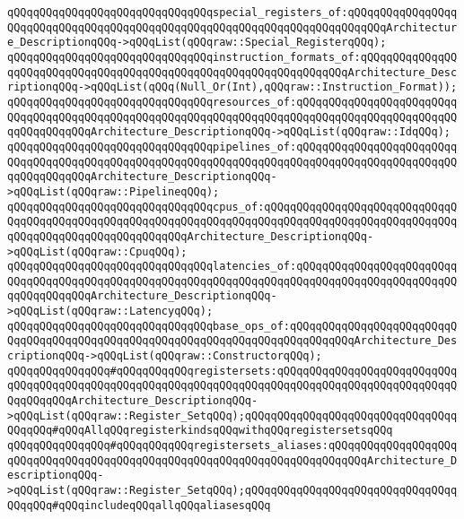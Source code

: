 \verb|qQQqqQQqqQQqqQQqqQQqqQQqqQQqqQQqspecial_registers_of:qQQqqQQqqQQqqQQqqQQqqQQqqQQqqQQqqQQqqQQqqQQqqQQqqQQqqQQqqQQqqQQqqQQqqQQqqQQqArchitecture_DescriptionqQQq->qQQqList(qQQqraw::Special_RegisterqQQq);|\newline
\verb|qQQqqQQqqQQqqQQqqQQqqQQqqQQqqQQqinstruction_formats_of:qQQqqQQqqQQqqQQqqQQqqQQqqQQqqQQqqQQqqQQqqQQqqQQqqQQqqQQqqQQqqQQqqQQqArchitecture_DescriptionqQQq->qQQqList(qQQq(Null_Or(Int),qQQqraw::Instruction_Format));|\newline
\verb|qQQqqQQqqQQqqQQqqQQqqQQqqQQqqQQqresources_of:qQQqqQQqqQQqqQQqqQQqqQQqqQQqqQQqqQQqqQQqqQQqqQQqqQQqqQQqqQQqqQQqqQQqqQQqqQQqqQQqqQQqqQQqqQQqqQQqqQQqqQQqqQQqArchitecture_DescriptionqQQq->qQQqList(qQQqraw::IdqQQq);|\newline
\verb|qQQqqQQqqQQqqQQqqQQqqQQqqQQqqQQqpipelines_of:qQQqqQQqqQQqqQQqqQQqqQQqqQQqqQQqqQQqqQQqqQQqqQQqqQQqqQQqqQQqqQQqqQQqqQQqqQQqqQQqqQQqqQQqqQQqqQQqqQQqqQQqqQQqArchitecture_DescriptionqQQq->qQQqList(qQQqraw::PipelineqQQq);|\newline
\verb|qQQqqQQqqQQqqQQqqQQqqQQqqQQqqQQqcpus_of:qQQqqQQqqQQqqQQqqQQqqQQqqQQqqQQqqQQqqQQqqQQqqQQqqQQqqQQqqQQqqQQqqQQqqQQqqQQqqQQqqQQqqQQqqQQqqQQqqQQqqQQqqQQqqQQqqQQqqQQqqQQqqQQqArchitecture_DescriptionqQQq->qQQqList(qQQqraw::CpuqQQq);|\newline
\verb|qQQqqQQqqQQqqQQqqQQqqQQqqQQqqQQqlatencies_of:qQQqqQQqqQQqqQQqqQQqqQQqqQQqqQQqqQQqqQQqqQQqqQQqqQQqqQQqqQQqqQQqqQQqqQQqqQQqqQQqqQQqqQQqqQQqqQQqqQQqqQQqqQQqArchitecture_DescriptionqQQq->qQQqList(qQQqraw::LatencyqQQq);|\newline
\verb|qQQqqQQqqQQqqQQqqQQqqQQqqQQqqQQqbase_ops_of:qQQqqQQqqQQqqQQqqQQqqQQqqQQqqQQqqQQqqQQqqQQqqQQqqQQqqQQqqQQqqQQqqQQqqQQqqQQqqQQqArchitecture_DescriptionqQQq->qQQqList(qQQqraw::ConstructorqQQq);|\newline
\newline
\verb|qQQqqQQqqQQqqQQq#qQQqqQQqqQQqregistersets:qQQqqQQqqQQqqQQqqQQqqQQqqQQqqQQqqQQqqQQqqQQqqQQqqQQqqQQqqQQqqQQqqQQqqQQqqQQqqQQqqQQqqQQqqQQqqQQqqQQqqQQqqQQqArchitecture_DescriptionqQQq->qQQqList(qQQqraw::Register_SetqQQq);qQQqqQQqqQQqqQQqqQQqqQQqqQQqqQQqqQQqqQQq#qQQqAllqQQqregisterkindsqQQqwithqQQqregistersetsqQQq|\newline
\verb|qQQqqQQqqQQqqQQq#qQQqqQQqqQQqregistersets_aliases:qQQqqQQqqQQqqQQqqQQqqQQqqQQqqQQqqQQqqQQqqQQqqQQqqQQqqQQqqQQqqQQqqQQqqQQqqQQqArchitecture_DescriptionqQQq->qQQqList(qQQqraw::Register_SetqQQq);qQQqqQQqqQQqqQQqqQQqqQQqqQQqqQQqqQQqqQQq#qQQqincludeqQQqallqQQqaliasesqQQq|\newline
\newline
